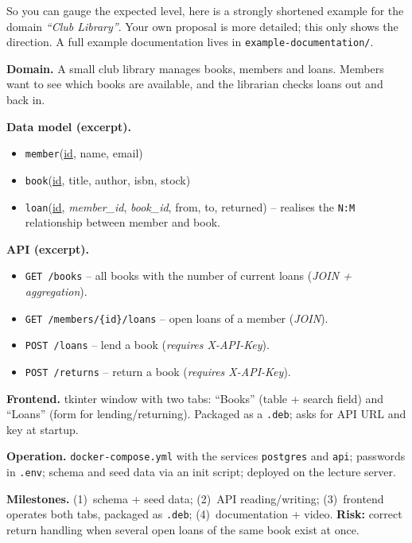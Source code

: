 \documentclass[11pt,a4paper]{article}
\begin{document}
So you can gauge the expected level, here is a strongly shortened example for
the domain \emph{``Club Library''}. Your own proposal is more detailed; this
only shows the direction. A full example documentation lives in
\texttt{example-documentation/}.

\begin{beispielbox}
\textbf{Domain.} A small club library manages books, members and loans. Members
want to see which books are available, and the librarian checks loans out and
back in.

\medskip
\textbf{Data model (excerpt).}
\begin{itemize}[leftmargin=1.4em, topsep=2pt]
  \item \texttt{member}(\underline{id}, name, email)
  \item \texttt{book}(\underline{id}, title, author, isbn, stock)
  \item \texttt{loan}(\underline{id}, \emph{member\_id}, \emph{book\_id},
        from, to, returned) -- realises the \texttt{N:M} relationship between
        member and book.
\end{itemize}

\textbf{API (excerpt).}
\begin{itemize}[leftmargin=1.4em, topsep=2pt]
  \item \texttt{GET /books} -- all books with the number of current loans
        (\emph{JOIN + aggregation}).
  \item \texttt{GET /members/\{id\}/loans} -- open loans of a member
        (\emph{JOIN}).
  \item \texttt{POST /loans} -- lend a book (\emph{requires X-API-Key}).
  \item \texttt{POST /returns} -- return a book (\emph{requires X-API-Key}).
\end{itemize}

\textbf{Frontend.} tkinter window with two tabs: ``Books'' (table + search
field) and ``Loans'' (form for lending/returning). Packaged as a \texttt{.deb};
asks for API URL and key at startup.

\medskip
\textbf{Operation.} \texttt{docker-compose.yml} with the services
\texttt{postgres} and \texttt{api}; passwords in \texttt{.env}; schema and seed
data via an init script; deployed on the lecture server.

\medskip
\textbf{Milestones.} (1)~schema + seed data; (2)~API reading/writing;
(3)~frontend operates both tabs, packaged as \texttt{.deb};
(4)~documentation + video. \textbf{Risk:} correct return handling when several
open loans of the same book exist at once.
\end{beispielbox}
\end{document}
